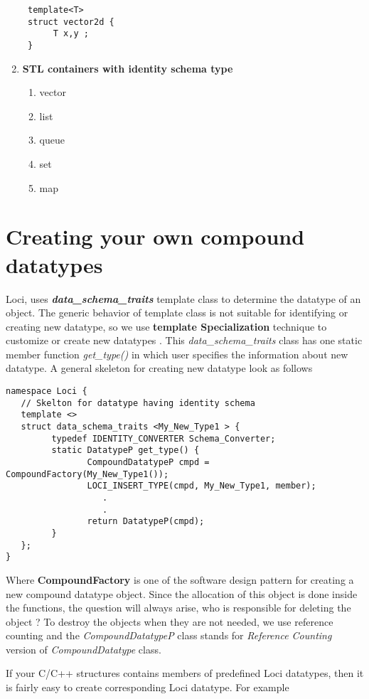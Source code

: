 \begin{enumerate}
\begin{verbatim}
 template<T>
 struct vector2d {
      T x,y ;
 }
\end{verbatim}
\item {\bf STL containers with identity schema type}
\begin{enumerate}
\item vector
\item list
\item queue
\item set
\item map
\end{enumerate}
\end{enumerate}
\section {Creating your own compound datatypes}
%
Loci, uses {\bf \em data\_schema\_traits} template class to determine the datatype of 
an object. The generic behavior of template class is not suitable for identifying 
or creating new datatype, so we use {\bf template Specialization }
technique to customize or create new datatypes . This {\em
data\_schema\_traits} class has one static member function {\em get\_type()} 
in which user specifies the information about new
datatype. A general skeleton for creating new datatype look as follows
\begin{verbatim}
namespace Loci {
   // Skelton for datatype having identity schema
   template <>
   struct data_schema_traits <My_New_Type1 > {
         typedef IDENTITY_CONVERTER Schema_Converter;
         static DatatypeP get_type() {
                CompoundDatatypeP cmpd = CompoundFactory(My_New_Type1());
                LOCI_INSERT_TYPE(cmpd, My_New_Type1, member);
                   .
                   .
                return DatatypeP(cmpd);
         }
   };
}
\end{verbatim}
%
Where {\bf CompoundFactory} is one of the software design pattern for creating a 
new compound datatype object. Since the allocation of this object is done inside
the functions, the question will always arise, who is responsible for deleting
the object ? To destroy the objects when they are not needed, we use reference counting and the 
{\em CompoundDatatypeP} class stands for {\em Reference Counting} version of
{\em CompoundDatatype} class.
%
\par If your C/C++ structures contains members of predefined Loci datatypes, then it
is fairly easy to create corresponding Loci datatype. For example

